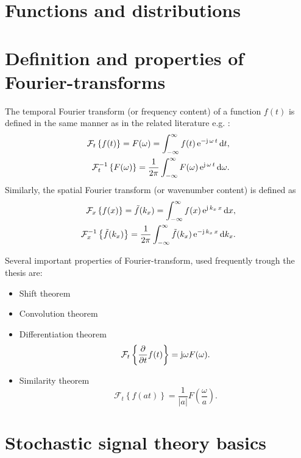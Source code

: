 \section{Functions and distributions}
\section{Definition and properties of Fourier-transforms}

The temporal Fourier transform (or frequency content) of a function $f(t)$ is defined in the same manner as in the related literature e.g. \cite{Ahrens2012, Ahrens2010a}:
%
\begin{align}
\mathcal{F}_{t} \left\{  f(t) \right\}  = F(\omega) = \int_{-\infty}^{\infty} f(t) \, \mathrm{e}^{-\mathrm{j} \,\omega \, t} \, \mathrm{d} t, \\
\mathcal{F}^{-1}_{t} \left\{  F(\omega) \right\}  = \frac{1}{2\pi} \int_{-\infty}^{\infty} F(\omega)\, \mathrm{e}^{\mathrm{j}\, \omega\, t} \, \mathrm{d} \omega.
\label{Eq:Math:Temp_Fourier}
\end{align}
%
Similarly, the spatial Fourier transform (or wavenumber content) is defined as
%
\begin{align}
\mathcal{F}_{x} \left\{  f(x) \right\}  = \tilde{f}(k_x) = \int_{-\infty}^{\infty} f(x)\, \mathrm{e}^{\mathrm{j}\, k_x\, x}\, \mathrm{d} x, \\
\mathcal{F}^{-1}_{x} \left\{  \tilde{f}(k_x) \right\}  = \frac{1}{2\pi} \int_{-\infty}^{\infty} \tilde{f}(k_x)\, \mathrm{e}^{-\mathrm{j}\, k_x\, x}\, \mathrm{d} k_x.
\end{align}

Several important properties of Fourier-transform, used frequently trough the thesis are:
\begin{itemize}
\item Shift theorem
%
\item Convolution theorem
%
\item Differentiation theorem
\begin{equation}
\mathcal{F}_{t} \left\{ \frac{\partial}{\partial t} f(t) \right\}  = \mathrm{j} \omega F(\omega).
\label{Eq:Math:Fourier_tr_diff}
\end{equation}
%
\item Similarity theorem
\begin{equation}
\mathcal{F}_{t} \left\{ f(a t) \right\}  = \frac{1}{|a|} F(\frac{\omega}{a}).
\label{Eq:Math:Fourier_tr_similarity}
\end{equation}
\end{itemize}
  

\section{Stochastic signal theory basics}

